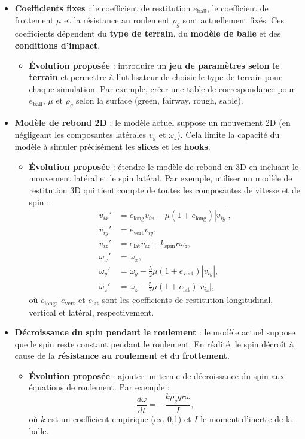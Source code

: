 \documentclass[10pt,a4paper]{report}
\begin{document}
\begin{itemize}
    \item \textbf{Coefficients fixes} : le coefficient de restitution $e_{\text{ball}}$, le coefficient de frottement $\mu$ et la résistance au roulement $\rho_g$ sont actuellement fixés. Ces coefficients dépendent du \textbf{type de terrain}, du \textbf{modèle de balle} et des \textbf{conditions d'impact}.
    \begin{itemize}
        \item \textbf{Évolution proposée} : introduire un \textbf{jeu de paramètres selon le terrain} et permettre à l'utilisateur de choisir le type de terrain pour chaque simulation. Par exemple, créer une table de correspondance pour $e_{\text{ball}}$, $\mu$ et $\rho_g$ selon la surface (green, fairway, rough, sable).
    \end{itemize}

    \item \textbf{Modèle de rebond 2D} : le modèle actuel suppose un mouvement 2D (en négligeant les composantes latérales $v_y$ et $\omega_z$). Cela limite la capacité du modèle à simuler précisément les \textbf{slices} et les \textbf{hooks}.
    \begin{itemize}
        \item \textbf{Évolution proposée} : étendre le modèle de rebond en 3D en incluant le mouvement latéral et le spin latéral. Par exemple, utiliser un modèle de restitution 3D qui tient compte de toutes les composantes de vitesse et de spin :
        \[
        \begin{aligned}
        v_{ix}' &= e_{\text{long}} v_{ix} - \mu (1 + e_{\text{long}}) |v_{iy}|, \\
        v_{iy}' &= e_{\text{vert}} v_{iy}, \\
        v_{iz}' &= e_{\text{lat}} v_{iz} + k_{\text{spin}} r \omega_z, \\
        \omega_x' &= \omega_x, \\
        \omega_y' &= \omega_y - \frac{5}{2} \mu (1 + e_{\text{vert}}) |v_{iy}|, \\
        \omega_z' &= \omega_z - \frac{5}{2} \mu (1 + e_{\text{lat}}) |v_{iz}|,
        \end{aligned}
        \]
        où $e_{\text{long}}$, $e_{\text{vert}}$ et $e_{\text{lat}}$ sont les coefficients de restitution longitudinal, vertical et latéral, respectivement.
    \end{itemize}

    \item \textbf{Décroissance du spin pendant le roulement} : le modèle actuel suppose que le spin reste constant pendant le roulement. En réalité, le spin décroît à cause de la \textbf{résistance au roulement} et du \textbf{frottement}.
    \begin{itemize}
        \item \textbf{Évolution proposée} : ajouter un terme de décroissance du spin aux équations de roulement. Par exemple :
        \[
        \frac{d\omega}{dt} = -\frac{k \rho_g g r \omega}{I},
        \]
        où $k$ est un coefficient empirique (ex. 0,1) et $I$ le moment d'inertie de la balle.
    \end{itemize}


\end{itemize}
\end{document}
